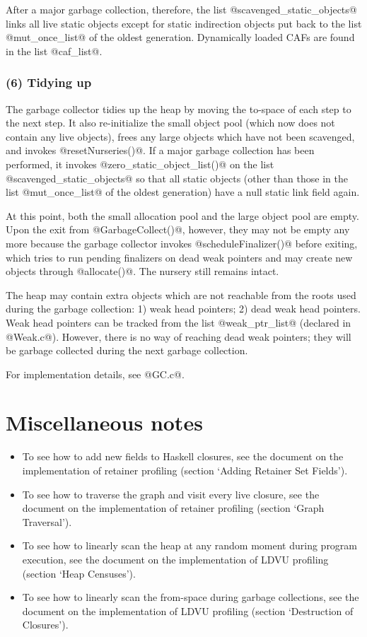 \documentclass{article}
\begin{document}
After a major garbage collection, therefore, the list @scavenged_static_objects@
links all live static objects except for static indirection objects put back
to the list @mut_once_list@ of the oldest generation. 
Dynamically loaded CAFs are found in the list @caf_list@.

\subsubsection{(6) Tidying up}

The garbage collector tidies up the heap by 
moving the to-space of each step to the next step. 
It also re-initialize the small object pool (which now does not contain
any live objects), frees any large objects which have not been scavenged,
and invokes @resetNurseries()@.
If a major garbage collection has been performed, it 
invokes @zero_static_object_list()@ on the list @scavenged_static_objects@ 
so that all static objects
(other than those in the list @mut_once_list@ of the oldest generation)
have a null static link field again.

At this point, both the small allocation pool and the large object pool are
empty. Upon the exit from @GarbageCollect()@, however, they may not
be empty any more because the garbage collector invokes @scheduleFinalizer()@
before exiting, which tries to run pending finalizers on dead weak pointers and 
may create new objects through @allocate()@.
The nursery still remains intact.

The heap may contain extra objects which are not reachable from the roots
used during the garbage collection: 1) weak head pointers; 2) dead
weak head pointers. Weak head pointers can be tracked from 
the list @weak_ptr_list@ (declared in @Weak.c@). However, there is no way
of reaching dead weak pointers; they will be garbage collected during the
next garbage collection.

For implementation details, see @GC.c@.

\section{Miscellaneous notes}

\begin{itemize}
\item To see how to add new fields to Haskell closures, 
see the document on the implementation of retainer profiling 
(section `Adding Retainer Set Fields').

\item To see how to traverse the graph and visit every live closure,
see the document on the implementation of retainer profiling
(section `Graph Traversal').

\item To see how to linearly scan the heap at any random moment during
program execution, see the document on the implementation of LDVU profiling
(section `Heap Censuses').

\item To see how to linearly scan the from-space during garbage collections,
see the document on the implementation of LDVU profiling
(section `Destruction of Closures').

\end{itemize}
\end{document}
